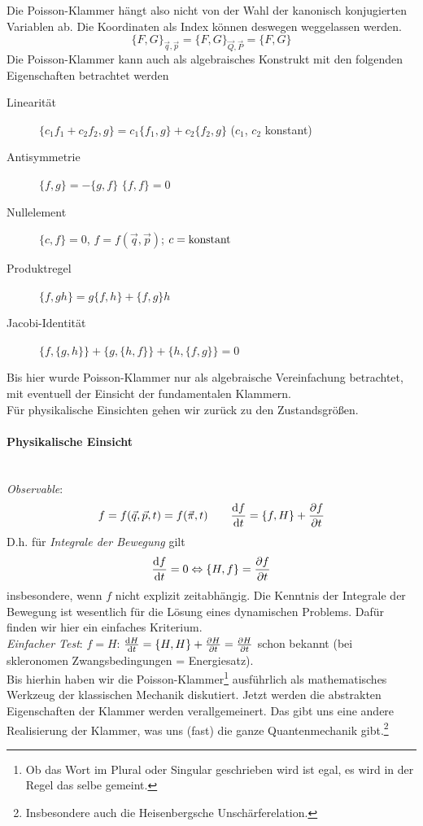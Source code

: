 Die Poisson-Klammer hängt also nicht von der Wahl der kanonisch konjugierten Variablen ab. Die Koordinaten als Index können deswegen weggelassen werden.
$$\{F, G\}_{\vec{q}, \vec{p}} = \{F, G\}_{\vec{Q}, \vec{P}} = \{F, G\}$$
Die Poisson-Klammer kann auch als algebraisches Konstrukt mit den folgenden Eigenschaften betrachtet werden 
\begin{description}
	\item[Linearität] $\{c_1 f_1 + c_2 f_2, g\} = c_1 \{f_1, g\} + c_2 \{f_2, g\}$ ($c_1$, $c_2$ konstant)
	\item[Antisymmetrie] $\{f, g\} = - \{g, f\}$ \conseq $\{f, f\} = 0$
	\item[Nullelement] $\{c, f\} = 0$, $f=f(\vec{q}, \vec{p})$; $c = \text{konstant}$
	\item[Produktregel] $\{f, g h\} = g \{f, h\} + \{f, g\} h$
	\item[Jacobi-Identität] $\{f, \{g, h\}\} + \{g, \{h, f\}\} + \{h, \{f, g\}\} = 0$
\end{description}

Bis hier wurde Poisson-Klammer nur als algebraische Vereinfachung betrachtet, mit eventuell der Einsicht der fundamentalen Klammern.\\
Für physikalische Einsichten gehen wir zurück zu den Zustandsgrößen.

\paragraph{Physikalische Einsicht}~\\
\textit{Observable}: 
$$f = f(\vec{q}, \vec{p}, t) = f(\vec{\pi}, t) \qquad \frac{\mathrm d f}{\mathrm d t} = \{f, H\} + \frac{\partial f}{\partial t}$$
D.h. für \textit{Integrale der Bewegung} gilt
$$\frac{\mathrm d f}{\mathrm d t} = 0 \Leftrightarrow \{H, f\} = \frac{\partial f}{\partial t}$$
insbesondere, wenn $f$ nicht explizit zeitabhängig. Die Kenntnis der Integrale der Bewegung ist wesentlich für die Lösung eines dynamischen Problems. Dafür finden wir hier ein einfaches Kriterium.\\
\textit{Einfacher Test}: $f = H$: $\frac{\mathrm d H}{\mathrm d t} = \{H, H\} + \frac{\partial H}{\partial t} = \frac{\partial H}{\partial t}$ schon bekannt (bei skleronomen Zwangsbedingungen = Energiesatz).\\
Bis hierhin haben wir die Poisson-Klammer\footnote{Ob das Wort im Plural oder Singular geschrieben wird ist egal, es wird in der Regel das selbe gemeint.} ausführlich als mathematisches Werkzeug der klassischen Mechanik diskutiert.
Jetzt werden die abstrakten Eigenschaften der Klammer werden verallgemeinert.
Das gibt uns eine andere Realisierung der Klammer, was uns (fast) die ganze Quantenmechanik gibt.\footnote{Insbesondere auch die Heisenbergsche Unschärferelation.}

